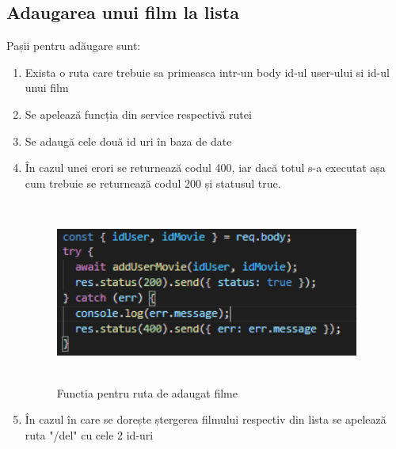 \subsection{Adaugarea unui film la lista}
\par Pașii pentru adăugare sunt:
\begin{enumerate}
  	\item Exista o ruta care trebuie sa primeasca intr-un body id-ul user-ului si id-ul unui film
  	\item Se apelează funcția din service respectivă rutei
	\item Se adaugă cele două id uri în baza de date
  	\item În cazul unei erori se returnează codul 400, iar dacă totul s-a executat așa cum trebuie se returnează codul 200 și statusul true.
		\begin{figure}[htbp]
			\centerline{\includegraphics[width=10cm, height=6cm]{figures/adaugare film lista.png}}
			\caption{Functia pentru ruta de adaugat filme}
			\label{fig}
		\end{figure}	
	\item  În cazul în care se dorește ștergerea filmului respectiv din lista se apelează ruta "/del" cu cele 2 id-uri
\end{enumerate}


